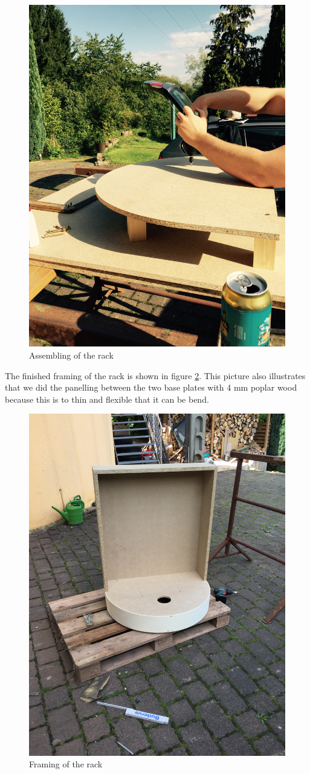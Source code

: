 \documentclass{acm_proc_article-sp}
\begin{document}
\begin{figure}[htbp] 
  \centering
     \includegraphics[width=0.5\linewidth]{pictures/assembling.jpg}
  \caption{Assembling of the rack}
  \label{fig:assembling}
\end{figure}

The finished framing of the rack is shown in figure \ref{fig:framing}. This picture also illustrates that we did the panelling between the two base plates with 4 mm poplar wood because this is to thin and flexible that it can be bend.

\begin{figure}[htbp] 
  \centering
     \includegraphics[width=0.6\linewidth, angle =270]{pictures/rack2.jpg}
  \caption{Framing of the rack}
  \label{fig:framing}
\end{figure}
\end{document}
